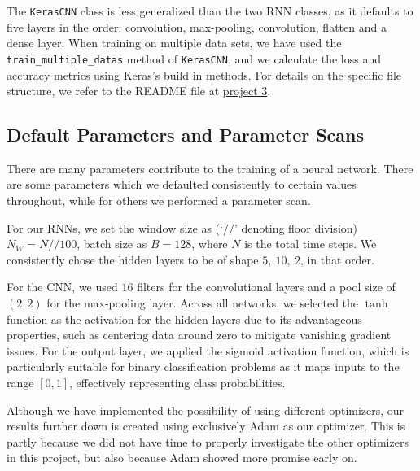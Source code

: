 \documentclass[%
reprint,
amsmath,amssymb,
aps,
]{revtex4-2}
\begin{document}
The \texttt{KerasCNN} class is less generalized than the two RNN classes, as it defaults to five layers in the order: convolution, max-pooling, convolution, flatten and  a dense layer. When training on multiple data sets, we have used the \texttt{train\_multiple\_datas} method of \texttt{KerasCNN}, and we calculate the loss and accuracy metrics using Keras's build in methods. For details on the specific file structure, we refer to the README file at \href{https://github.com/EdvardRornes/FYS-STK4155/tree/main/Project3}{project 3}.

\subsection{Default Parameters and Parameter Scans}
There are many parameters contribute to the training of a neural network. There are some parameters which we defaulted consistently to certain values throughout, while for others we performed a parameter scan. 

For our RNNs, we set the window size as (`\(//\)' denoting floor division) \(N_{W} = N//100\), batch size as \(B=128\), where \(N\) is the total time steps. We consistently chose the hidden layers to be of shape \(5, \ 10, \ 2\), in that order. 

For the CNN, we used \(16\) filters for the convolutional layers and a pool size of \((2,2)\) for the max-pooling layer. Across all networks, we selected the \(\tanh\) function as the activation for the hidden layers due to its advantageous properties, such as centering data around zero to mitigate vanishing gradient issues. For the output layer, we applied the sigmoid activation function, which is particularly suitable for binary classification problems as it maps inputs to the range \([0,1]\), effectively representing class probabilities.

Although we have implemented the possibility of using different optimizers, our results further down is created using exclusively Adam as our optimizer. This is partly because we did not have time to properly investigate the other optimizers in this project, but also because Adam showed more promise early on. 
\end{document}
